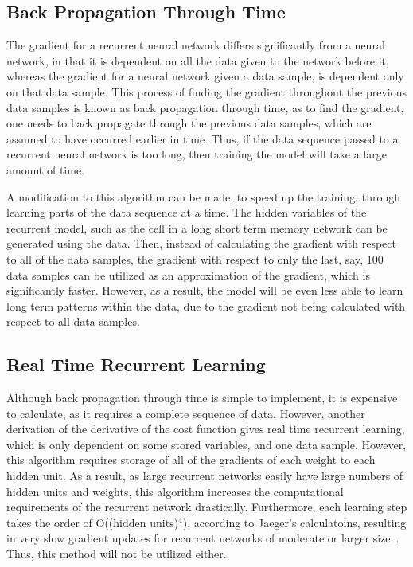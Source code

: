 \documentclass{article}
\begin{document}
\subsection{Back Propagation Through Time}
The gradient for a recurrent neural network differs significantly from a neural
network, in that it is dependent on all the data given to the network before it,
whereas the gradient for a neural network given a data sample, is dependent only
on that data sample. This process of finding the gradient throughout the
previous data samples is known as back propagation through time, as to find the
gradient, one needs to back propagate through the previous data samples, which
are assumed to have occurred earlier in time. Thus, if the data sequence passed
to a recurrent neural network is too long, then training the model will take a
large amount of time.

A modification to this algorithm can be made, to speed up the training, through
learning parts of the data sequence at a time. The hidden variables of the
recurrent model, such as the cell in a long short term memory network can be
generated using the data. Then, instead of calculating the gradient with respect
to all of the data samples, the gradient with respect to only the last, say, 100
data samples can be utilized as an approximation of the gradient, which is
significantly faster. However, as a result, the model will be even less able to
learn long term patterns within the data, due to the gradient not being
calculated with respect to all data samples.


\subsection{Real Time Recurrent Learning}
Although back propagation through time is simple to implement, it is expensive
to calculate, as it requires a complete sequence of data. However, another
derivation of the derivative of the cost function gives real time recurrent
learning, which is only dependent on some stored variables, and one data sample.
However, this algorithm requires storage of all of the gradients of each weight
to each hidden unit. As a result, as large recurrent networks easily have large
numbers of hidden units and weights, this algorithm increases the computational
requirements of the recurrent network drastically. Furthermore, each learning
step takes the order of O((hidden units)$^4$), according to Jaeger's calculatoins,
resulting in very slow gradient updates for recurrent networks of moderate or
larger size~\cite{rnntrain}. Thus, this method will not be utilized either.
\end{document}
